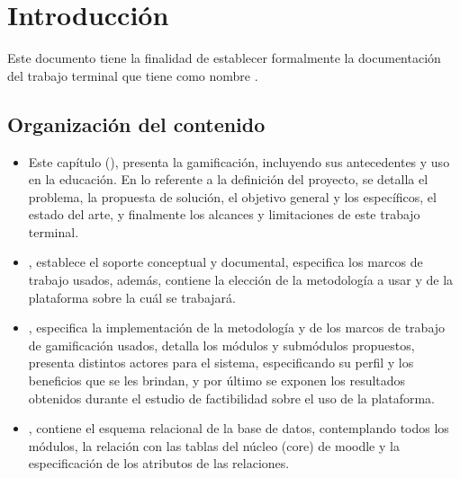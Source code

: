 \chapter{Introducción}
\label{ch:introduccion}

 Este documento tiene la finalidad de establecer formalmente la documentación del
 trabajo terminal {\numeroTT} que tiene como nombre {\bf\tituloTT}.

\section{Organización del contenido}

    \begin{itemize}
        \item Este capítulo (), presenta la
        gamificación, incluyendo sus antecedentes y uso en la educación. En lo referente
        a la definición del proyecto, se detalla el problema, la propuesta de solución,
        el objetivo general y los específicos, el estado del arte, y finalmente los
        alcances y limitaciones de este trabajo terminal.

        \item {}, establece el soporte conceptual y documental,
        especifica los marcos de trabajo usados, además, contiene la elección de la
        metodología a usar y de la plataforma sobre la cuál se trabajará.

    \end{itemize}

\begin{itemize}

    \item {}, especifica la implementación de la metodología y de los marcos de
    trabajo de gamificación usados, detalla los módulos y submódulos propuestos, presenta distintos
    actores para el sistema, especificando su perfil y los beneficios que se les brindan, y por
    último se exponen los resultados obtenidos durante el estudio de factibilidad sobre el uso
    de la plataforma.


    \item {}, contiene el esquema relacional de la base de
    datos, contemplando todos los módulos, la relación con las tablas del núcleo (core)
    de moodle y la especificación de los atributos de las relaciones.

\end{itemize}


